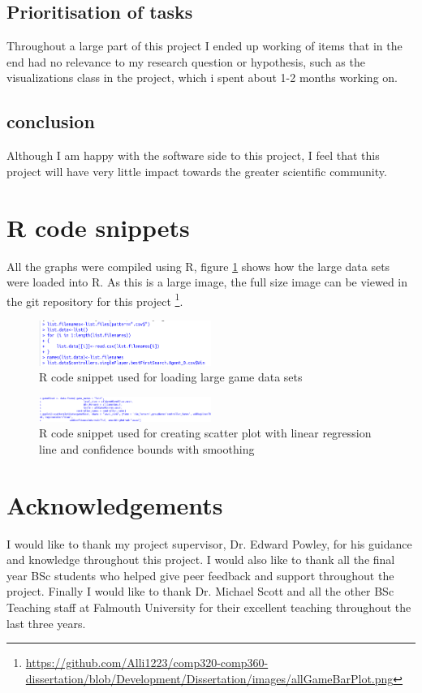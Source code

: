 \documentclass[journal]{IEEEtran}
\begin{document}
	\subsection{Prioritisation of tasks}
		Throughout a large part of this project I ended up working of items that in the end had no relevance to my research question or hypothesis, such as the visualizations class in the project, which i spent about 1-2 months working on.

		\subsection{conclusion}
			Although I am happy with the software side to this project, I feel that this project will have very little impact towards the greater scientific community.

\section{R code snippets}
All the graphs were compiled using R, figure \ref{fig:croppedR1} shows how the large data sets were loaded into R. As this is a large image, the full size image can be viewed in the git repository for this project \footnote{\url{https://github.com/Alli1223/comp320-comp360-dissertation/blob/Development/Dissertation/images/allGameBarPlot.png}}.

		\begin{figure}[h]
		    \centering
		    \includegraphics[width=0.5\textwidth]{croppedR1}
		    \caption{ R code snippet used for loading large game data sets }
		    \label{fig:croppedR1}
		\end{figure}

		\begin{figure}[h]
		    \centering
		    \includegraphics[width=0.5\textwidth]{croppedR2}
		    \caption{ R code snippet used for creating scatter plot with linear regression line and confidence bounds with smoothing }
		    \label{fig:croppedR2}
		\end{figure}

		\section{Acknowledgements}
			I would like to thank my project supervisor, Dr. Edward Powley, for his guidance and knowledge throughout this project. I would also like to thank all the final year BSc students who helped give peer feedback and support throughout the project. Finally I would like to thank Dr. Michael Scott and all the other BSc Teaching staff at Falmouth University for their excellent teaching throughout the last three years.
\end{document}
